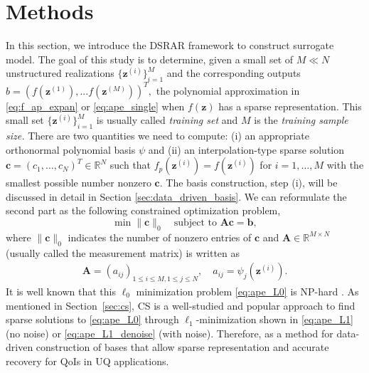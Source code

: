 \section{Methods} \label{sec:num_method}
In this section, we introduce the \ac{DSRAR} framework to construct
surrogate model. The goal of this study is to determine, given a small set of $M\ll N$ unstructured realizations 
$\{\bm{z}^{(i)}\}_{i=1}^M$ and the corresponding outputs $b=(f(\bm{z}^{(1)}),...f(\bm{z}^{(M)}))^{T},$ the polynomial 
approximation in \eqref{eq:f_ap_expan} or \eqref{eq:ape_single} when $f(\bm{z})$ has a sparse representation. 
{\color{blue}This small set $\{\bm{z}^{(i)}\}_{i=1}^M$ is usually called 
\emph{training set} and $M$ is the \emph{training sample size.}}
There are two quantities we need to compute: (i) an appropriate orthonormal polynomial basis $\psi$ and (ii) an interpolation-type sparse solution $\bm{c} = (c_1,\dots,c_N)^T\in \mathbb{R}^N$ such that $f_p(\bm{z}^{(i)}) = f(\bm{z}^{(i)})$ for $i = 1,\dots,M$ with the smallest possible number nonzero $\bm{c}$.
The basis construction, step (i), will be discussed in detail in Section \ref{sec:data_driven_basis}.
We can reformulate the second part as the following constrained optimization problem,
\begin{equation}\label{eq:ape_L0}
    \min \|\bm{c}\|_0 \quad \text{subject to }\bm A\bm{c}=\bm{b},
\end{equation}
where $\|\bm{c}\|_0$ indicates the number of nonzero entries of $\bm{c}$ and $\bm A \in \mathbb{R}^{M \times N}$ (usually called the measurement matrix) is written as
\begin{eqnarray}\label{eq:matrixelem}
    \bm A=(a_{ij})_{1\leq i\leq M,1\leq j\leq N}, \quad a_{ij}=\psi_{j}(\bm{z}^{(i)}).
\end{eqnarray}
It is well known that this $\ell_0$ minimization problem \eqref{eq:ape_L0} is NP-hard \cite{Natarajan_1995L0}. 
As mentioned in Section~\ref{sec:cs}, \ac{CS} is a well-studied and popular approach to find sparse solutions to \eqref{eq:ape_L0} through $\ell_1$-minimization shown in \eqref{eq:ape_L1} (no noise) or \eqref{eq:ape_L1_denoise} (with noise).
Therefore,  as a method for 
data-driven construction of bases that allow sparse representation and accurate 
recovery for \acp{QoI} in \ac{UQ} applications.

